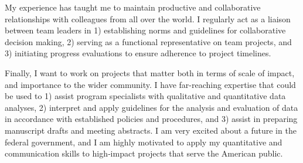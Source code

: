 \documentclass[11pt, a4paper]{maedbh-cv}
\begin{document}
\begin{cvletter}
	My experience has taught me to maintain productive and collaborative relationships with colleagues from all over the world. I regularly act as a liaison between team leaders in 1) establishing norms and guidelines for collaborative decision making, 2) serving as a functional representative on team projects, and 3) initiating progress evaluations to ensure adherence to project timelines.  

	Finally, I want to work on projects that matter both in terms of scale of impact, and importance to the wider community. I have far-reaching expertise that could be used to 1) assist program specialists with qualitative and quantitative data analyses, 2) interpret and apply guidelines for the analysis and evaluation of data in accordance with established policies and procedures, and 3) assist in preparing manuscript drafts and meeting abstracts. I am very excited about a future in the federal government, and I am highly motivated to apply my quantitative and communication skills to high‐impact projects that serve the American public. 

\end{cvletter}

\makeletterclosing
\end{document}
